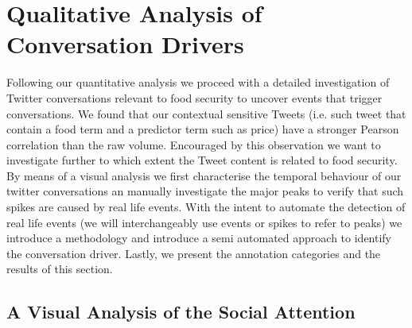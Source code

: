  \section{Qualitative Analysis of Conversation Drivers}
 \label{conversation}


Following our quantitative analysis we proceed with a detailed investigation of Twitter conversations relevant to food security to uncover events that trigger conversations. We found that our contextual sensitive Tweets (i.e. such tweet that contain a food term and a predictor term such as price) have a stronger Pearson correlation than the raw volume. Encouraged by this observation we want to investigate further to which extent the Tweet content is related to food security. By means of a visual analysis we first characterise the temporal behaviour of our twitter conversations an manually investigate the major peaks to verify that such spikes are caused by real life events. With the intent to automate the detection of real life events (we will interchangeably use events or spikes to refer to peaks) we introduce a methodology and introduce a semi automated approach to identify the conversation driver. Lastly, we present the annotation categories and the results of this section. 

\subsection{A Visual Analysis of the Social Attention}

